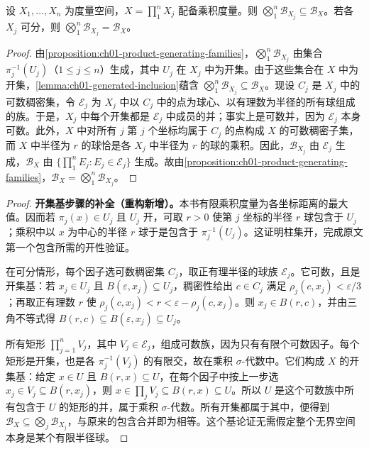 \documentclass[../../main.tex]{subfiles}%
\begin{document}
\begin{proposition}\label{proposition:ch01-product-borel}
设 $X_1,\ldots,X_n$ 为度量空间，$X=\prod_1^nX_j$ 配备乘积度量。则 $\bigotimes_1^n\mathscr{B}_{X_j}\subseteq\mathscr{B}_X$。若各 $X_j$ 可分，则 $\bigotimes_1^n\mathscr{B}_{X_j}=\mathscr{B}_X$。
\end{proposition}

\begin{proof}
由\cref{proposition:ch01-product-generating-families}，$\bigotimes_1^n\mathscr{B}_{X_j}$ 由集合 $\pi_j^{-1}(U_j)$（$1\leqslant j\leqslant n$）生成，其中 $U_j$ 在 $X_j$ 中为开集。由于这些集合在 $X$ 中为开集，\cref{lemma:ch01-generated-inclusion}蕴含 $\bigotimes_1^n\mathscr{B}_{X_j}\subseteq\mathscr{B}_X$。现设 $C_j$ 是 $X_j$ 中的可数稠密集，令 $\mathscr{E}_j$ 为 $X_j$ 中以 $C_j$ 中的点为球心、以有理数为半径的所有球组成的族。于是，$X_j$ 中每个开集都是 $\mathscr{E}_j$ 中成员的并；事实上是可数并，因为 $\mathscr{E}_j$ 本身可数。此外，$X$ 中对所有 $j$ 第 $j$ 个坐标均属于 $C_j$ 的点构成 $X$ 的可数稠密子集，而 $X$ 中半径为 $r$ 的球恰是各 $X_j$ 中半径为 $r$ 的球的乘积。因此，$\mathscr{B}_{X_j}$ 由 $\mathscr{E}_j$ 生成，$\mathscr{B}_X$ 由 $\{\prod_1^nE_j:E_j\in\mathscr{E}_j\}$ 生成。故由\cref{proposition:ch01-product-generating-families}，$\mathscr{B}_X=\bigotimes_1^n\mathscr{B}_{X_j}$。
\end{proof}
\begin{proof}
\textbf{开集基步骤的补全（重构新增）。}本书有限乘积度量为各坐标距离的最大值。因而若 $\pi_j(x)\in U_j$ 且 $U_j$ 开，可取 $r>0$ 使第 $j$ 坐标的半径 $r$ 球包含于 $U_j$；乘积中以 $x$ 为中心的半径 $r$ 球于是包含于 $\pi_j^{-1}(U_j)$。这证明柱集开，完成原文第一个包含所需的开性验证。

在可分情形，每个因子选可数稠密集 $C_j$，取正有理半径的球族 $\mathscr{E}_j$。它可数，且是开集基：若 $x_j\in U_j$ 且 $B(\varepsilon,x_j)\subseteq U_j$，稠密性给出 $c\in C_j$ 满足 $\rho_j(c,x_j)<\varepsilon/3$；再取正有理数 $r$ 使 $\rho_j(c,x_j)<r<\varepsilon-\rho_j(c,x_j)$。则 $x_j\in B(r,c)$，并由三角不等式得 $B(r,c)\subseteq B(\varepsilon,x_j)\subseteq U_j$。

所有矩形 $\prod_{j=1}^nV_j$，其中 $V_j\in\mathscr{E}_j$，组成可数族，因为只有有限个可数因子。每个矩形是开集，也是各 $\pi_j^{-1}(V_j)$ 的有限交，故在乘积 $\sigma$-代数中。它们构成 $X$ 的开集基：给定 $x\in U$ 且 $B(r,x)\subseteq U$，在每个因子中按上一步选 $x_j\in V_j\subseteq B(r,x_j)$，则 $x\in\prod_jV_j\subseteq B(r,x)\subseteq U$。所以 $U$ 是这个可数族中所有包含于 $U$ 的矩形的并，属于乘积 $\sigma$-代数。所有开集都属于其中，便得到 $\mathscr{B}_X\subseteq\bigotimes_j\mathscr{B}_{X_j}$，与原来的包含合并即为相等。这个基论证无需假定整个无界空间本身是某个有限半径球。
\end{proof}
\end{document}

